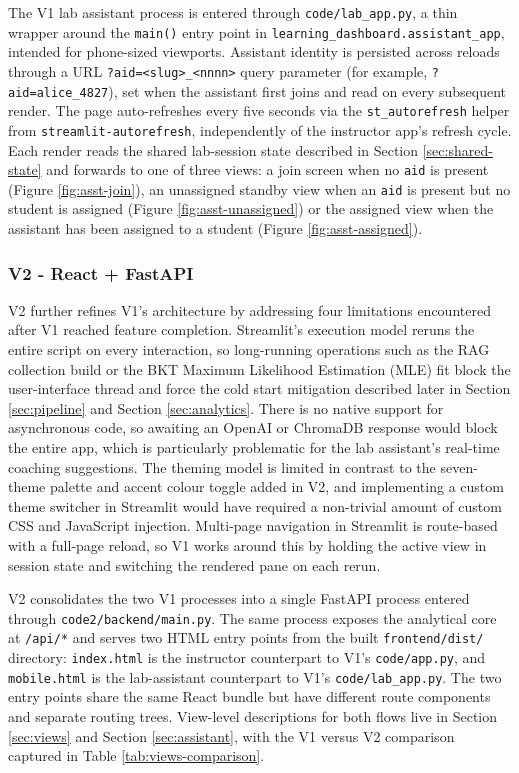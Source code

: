 The V1 lab assistant process is entered through \texttt{code/lab\_app.py}, a thin wrapper around the \texttt{main()} entry point in \texttt{learning\_dashboard.assistant\_app}, intended for phone-sized viewports.
Assistant identity is persisted across reloads through a URL \texttt{?aid=<slug>\_<nnnn>} query parameter (for example, \texttt{?aid=alice\_4827}), set when the assistant first joins and read on every subsequent render.
The page auto-refreshes every five seconds via the \texttt{st\_autorefresh} helper from \texttt{streamlit-autorefresh}, independently of the instructor app's refresh cycle.
Each render reads the shared lab-session state described in Section \ref{sec:shared-state} and forwards to one of three views: a join screen when no \texttt{aid} is present (Figure \ref{fig:asst-join}), an unassigned standby view when an \texttt{aid} is present but no student is assigned (Figure \ref{fig:asst-unassigned}) or the assigned view when the assistant has been assigned to a student (Figure \ref{fig:asst-assigned}).

\subsubsection{V2 - React + FastAPI} \label{sec:v2-react-fastapi}

V2 further refines V1's architecture by addressing four limitations encountered after V1 reached feature completion.
Streamlit's execution model reruns the entire script on every interaction, so long-running operations such as the RAG collection build or the BKT Maximum Likelihood Estimation (MLE) fit block the user-interface thread and force the cold start mitigation described later in Section \ref{sec:pipeline} and Section \ref{sec:analytics}.
There is no native support for asynchronous code, so awaiting an OpenAI or ChromaDB response would block the entire app, which is particularly problematic for the lab assistant's real-time coaching suggestions.
The theming model is limited in contrast to the seven-theme palette and accent colour toggle added in V2, and implementing a custom theme switcher in Streamlit would have required a non-trivial amount of custom CSS and JavaScript injection.
Multi-page navigation in Streamlit is route-based with a full-page reload, so V1 works around this by holding the active view in session state and switching the rendered pane on each rerun.


V2 consolidates the two V1 processes into a single FastAPI process entered through \texttt{code2/backend/main.py}. 
The same process exposes the analytical core at \texttt{/api/*} and serves two HTML entry points from the built \texttt{frontend/dist/} directory: \texttt{index.html} is the instructor counterpart to V1's \texttt{code/app.py}, and \texttt{mobile.html} is the lab-assistant counterpart to V1's \texttt{code/lab\_app.py}.
The two entry points share the same React bundle but have different route components and separate routing trees.
View-level descriptions for both flows live in Section \ref{sec:views} and Section \ref{sec:assistant}, with the V1 versus V2 comparison captured in Table \ref{tab:views-comparison}.

